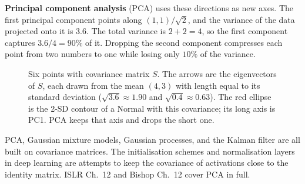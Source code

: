 \textbf{Principal component analysis} (PCA) uses these directions as new axes. The first
principal component points along $(1,1)/\sqrt2$, and the variance of the data projected onto it
is $3.6$. The total variance is $2+2=4$, so the first component captures $3.6/4=90\%$ of it.
Dropping the second component compresses each point from two numbers to one while losing only
$10\%$ of the variance.

\begin{figure}[H]
\centering
{}
\caption{Six points with covariance matrix $S$. The arrows are the eigenvectors of $S$, each
drawn from the mean $(4,3)$ with length equal to its standard deviation ($\sqrt{3.6}\approx1.90$ and
$\sqrt{0.4}\approx0.63$). The red ellipse is the 2-SD contour of a Normal with this
covariance; its long axis is PC1. PCA keeps that axis and drops the short one.}
\label{fig:ml-pca}
\end{figure}

\begin{connectionbox}
PCA, Gaussian mixture models, Gaussian processes, and the Kalman filter are all built on
covariance matrices. The initialisation schemes and normalisation layers in deep learning are
attempts to keep the covariance of activations close to the identity matrix. ISLR Ch.~12 and
Bishop Ch.~12 cover PCA in full.
\end{connectionbox}

